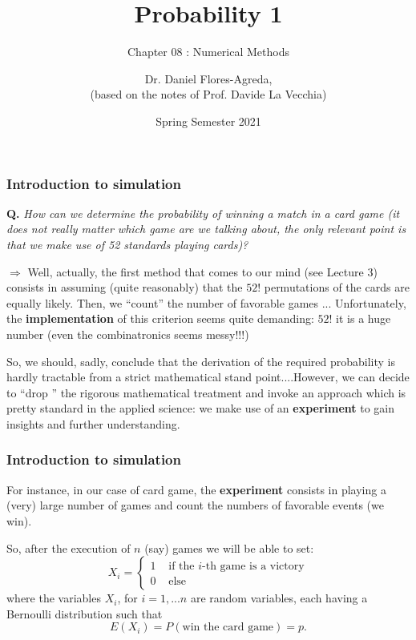 \documentclass[notes=show,smaller,handout]{beamer}\usepackage[]{graphicx}\usepackage[]{color}
\begin{document}
\title[S110015]{Probability 1}
\subtitle{Chapter 08 : Numerical Methods}
\author[Flores-Agreda, La Vecchia]{Dr. Daniel Flores-Agreda, \\[0.5em] \tiny{(based on the notes of Prof. Davide La Vecchia)}}
\date{Spring Semester 2021}

\begin{frame}
\titlepage
\end{frame}


\begin{frame}
\frametitle{Introduction to simulation}

\color{red} \textbf{Q.} \textit{How can we determine the probability of winning a match in a card game (it does not really matter which game are we talking about, the only relevant point is that we make use of 52 standards playing cards)?} \color{black}

\vspace{1cm}

$\Rightarrow$  Well, actually, the first method that comes to our mind (see Lecture 3) consists in assuming (quite reasonably) that the
$52!$ permutations of the cards are equally likely. Then, we ``count'' the number of favorable games ... \pause
Unfortunately, the \textbf{implementation} of this criterion seems quite demanding: $52!$ it is a huge number (even the combinatronics
seems messy!!!)

\vspace{0.4cm}
So, we should, sadly, conclude that  the derivation of the required probability is hardly tractable from a strict mathematical stand point....However,
we can decide to ``drop '' the rigorous mathematical treatment and invoke an approach which is pretty standard
in the applied science: we make use of an \textbf{experiment} to gain insights and further understanding.


\end{frame}


\begin{frame}
\frametitle{Introduction to simulation}

For instance,  in our case of card game, the \textbf{experiment} consists in playing a (very) large number of games and count the numbers of favorable events (we win).

\vspace{0.4cm}

So, after the execution of $n$ (say) games we will be able to set:
$$
X_i = \left\{\begin{array}{ll}
1& \mbox{ if the $i$-th game is a victory}\\
0 & \mbox{ else}
\end{array}\right.
$$
where the variables $X_i$, for $i=1,...n$ are random variables, each having a Bernoulli distribution such that
$$
E(X_i) = P(\text{win the card game}) = p.
$$

\end{frame}
\end{document}
